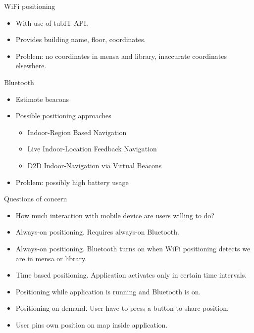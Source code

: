 \documentclass[9pt]{beamer}
\begin{document}
\begin{frame}{WiFi positioning}

	\begin{itemize}
	
		\item With use of tubIT API.
		\item Provides building name, floor, coordinates.
		\item Problem: no coordinates in mensa and library, inaccurate coordinates elsewhere.

	\end{itemize}
	
\end{frame}

\begin{frame}{Bluetooth}

	\begin{itemize}
	
		\item Estimote beacons
		\item Possible positioning approaches
			\begin{itemize}
				\item Indoor-Region Based Navigation
				\item Live Indoor-Location Feedback Navigation
				\item D2D Indoor-Navigation via Virtual Beacons
			\end{itemize}
		\item Problem: possibly high battery usage

	\end{itemize}

\end{frame}

\begin{frame}{Questions of concern}

	\begin{itemize}
	
		\item How much interaction with mobile device are users willing to do?
		\item Always-on positioning. Requires always-on Bluetooth.
		\item Always-on positioning. Bluetooth turns on when WiFi positioning detects we are in mensa or library.
		\item Time based positioning. Application activates only in certain time intervals.
		\item Positioning while application is running and Bluetooth is on.
		\item Positioning on demand. User have to press a button to share position.
		\item User pins own position on map inside application.
	
	\end{itemize}

\end{frame}
\end{document}
